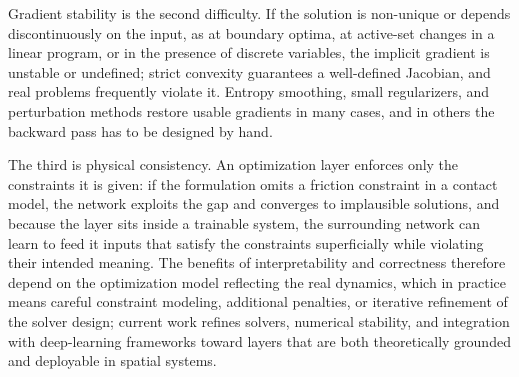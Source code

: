 Gradient stability is the second difficulty.
If the solution is non-unique or depends discontinuously on the input, as at boundary optima, at active-set changes in a linear program, or in the presence of discrete variables, the implicit gradient is unstable or undefined; strict convexity guarantees a well-defined Jacobian, and real problems frequently violate it.
Entropy smoothing, small regularizers, and perturbation methods restore usable gradients in many cases, and in others the backward pass has to be designed by hand.

The third is physical consistency.
An optimization layer enforces only the constraints it is given: if the formulation omits a friction constraint in a contact model, the network exploits the gap and converges to implausible solutions, and because the layer sits inside a trainable system, the surrounding network can learn to feed it inputs that satisfy the constraints superficially while violating their intended meaning.
The benefits of interpretability and correctness therefore depend on the optimization model reflecting the real dynamics, which in practice means careful constraint modeling, additional penalties, or iterative refinement of the solver design; current work refines solvers, numerical stability, and integration with deep-learning frameworks toward layers that are both theoretically grounded and deployable in spatial systems.

